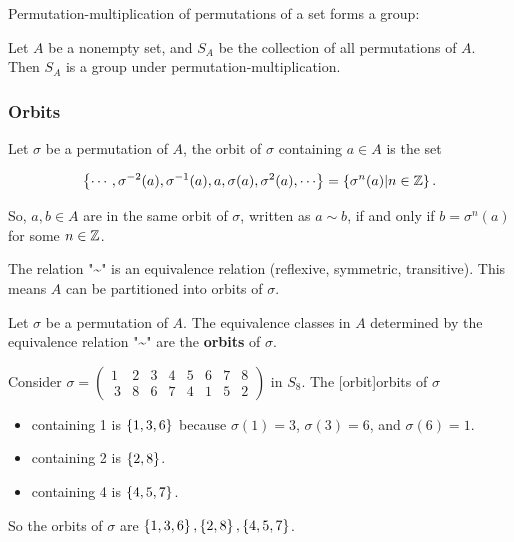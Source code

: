 \documentclass{article}
\begin{document}
\@{Permutation-multiplication} of permutations of a set forms a \@{group}:

\begin{theorem}\label{permutations-form-group}
Let $A$ be a nonempty set, and $S_A$ be the collection of all \@{permutations} of $A$. Then $S_A$ is a \@{group} under \@{permutation-multiplication}.
\end{theorem}

\subsubsection{Orbits}

\begin{definition}
Let $\sigma$ be a \@{permutation} of $A$, the orbit of $\sigma$ containing $a \in A$ is the set

\[ \set{\cdots, \sigma^{-2}(a), \sigma^{-1}(a), a, \sigma{(a)}, \sigma^{2}(a), \cdots} = \set{\sigma^n(a) | n \in \integers}. \]

So, $a,b \in A$ are in the same orbit of $\sigma$, written as $a \sim b$, if and only if $b = \sigma^n(a)$ for some $n \in \mathbb{Z}$.

The relation "\textasciitilde{}" is an equivalence relation (reflexive, symmetric, transitive). This means $A$ can be partitioned into orbits of $\sigma$.
\end{definition}

\begin{definition}[orbit]
Let $\sigma$ be a \@{permutation} of $A$. The equivalence classes in $A$ determined by the equivalence relation "\textasciitilde{}" are the \textbf{orbits} of $\sigma$.
\end{definition}

\begin{example}
Consider $\sigma = \begin{pmatrix} 1 & 2 & 3 & 4 & 5 & 6 & 7 & 8 \\\ 3 & 8 & 6 & 7 & 4 & 1 & 5 & 2 \end{pmatrix}$ in $S_8$. The \@[orbit]{orbits} of $\sigma$

\begin{itemize}
\item containing 1 is $\left\{ 1,3,6 \right\}$ because $\sigma(1) = 3$, $\sigma(3) = 6$, and $\sigma(6) = 1$.
\end{itemize}

\begin{itemize}
\item containing 2 is $\left\{ 2,8 \right\}$.
\end{itemize}

\begin{itemize}
\item containing 4 is $\left\{ 4, 5, 7 \right\}$.
\end{itemize}

So the orbits of $\sigma$ are $\left\{ 1,3,6 \right\}, \left\{ 2,8 \right\}, \left\{ 4,5,7 \right\}$.
\end{example}
\end{document}
